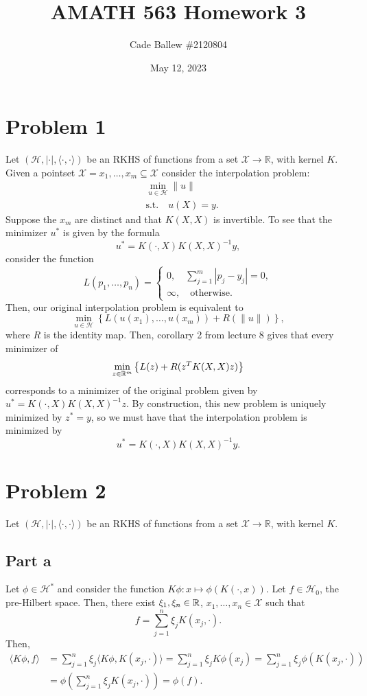 \documentclass{article}
\title{AMATH 563 Homework 3}
\author{Cade Ballew \#2120804}
\date{May 12, 2023}
\begin{document}
	
\maketitle
	
\section{Problem 1}
Let $(\mathcal{H}, |\cdot|, \langle\cdot,\cdot\rangle)$ be an RKHS of functions from a set $\mathcal{X} \rightarrow \mathbb{R}$, with kernel $K$. Given a pointset $\mathcal{X} = {x_1, \dots, x_m} \subseteq \mathcal{X}$ consider the interpolation problem:
\begin{equation*}
	\begin{aligned}
		&\min_{u \in \mathcal{H}} \|u\| \\
		&\text{s.t.}\quad u(X) = y.
	\end{aligned}
\end{equation*}
Suppose the $x_m$ are distinct and that $K(X, X)$ is invertible. To see that the minimizer $u^\ast$ is given by the formula
\begin{equation*}
	u^\ast = K(\cdot, X)K(X, X)^{-1}y,
\end{equation*}
consider the function
\[
L(p_1,\ldots,p_n)=\begin{cases}
	0,\quad\sum_{j=1}^m|p_j-y_j|=0,\\
	\infty,\quad\text{otherwise}.
\end{cases}
\]
Then, our original interpolation problem is equivalent to
\[
\min_{u \in \mathcal{H}}\left\{L(u(x_1),\ldots,u(x_m))+R(\|u\|)\right\},
\]
where $R$ is the identity map. Then, corollary 2 from lecture 8 gives that every minimizer of 
\[
\min_{z\in\mathbb{R}^m}\left\{L(z)+R(z^TK(X,X)z)\right\}
\]
corresponds to a minimizer of the original problem given by $u^\ast = K(\cdot, X)K(X, X)^{-1}z$. By construction, this new problem is uniquely minimized by $z^*=y$, so we must have that the interpolation problem is minimized by 
\[
u^\ast = K(\cdot, X)K(X, X)^{-1}y.
\]

\section{Problem 2}
Let $(\mathcal{H}, |\cdot|, \langle\cdot,\cdot\rangle)$ be an RKHS of functions from a set $\mathcal{X} \rightarrow \mathbb{R}$, with kernel $K$.
\subsection{Part a}
Let $\phi\in\mathcal{H}^*$ and consider the function $K\phi:x\mapsto\phi(K(\cdot,x))$. Let $f\in\mathcal{H}_0$, the pre-Hilbert space. Then, there exist $\xi_1,\xi_n\in\mathbb{R}$, $x_1,\ldots,x_n\in\mathcal{X}$ such that
\[
f=\sum_{j=1}^n\xi_jK(x_j,\cdot).
\]
Then, 
\begin{align*}
\langle K\phi,f\rangle&=\sum_{j=1}^n\xi_j\langle K\phi,K(x_j,\cdot)\rangle=\sum_{j=1}^n\xi_j K\phi(x_j)=\sum_{j=1}^n\xi_j \phi(K(x_j,\cdot))\\&=
\phi\left(\sum_{j=1}^n\xi_jK(x_j,\cdot)\right)=\phi(f).
\end{align*}
\end{document}
